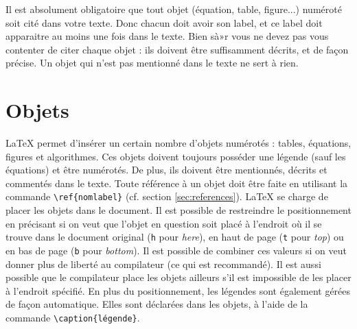 \documentclass{ceri}
\begin{document}
Il est absolument obligatoire que tout objet (équation, table, figure...) numéroté soit cité dans votre texte. Donc chacun doit avoir son label, et ce label doit apparaitre au moins une fois dans le texte. Bien sà»r vous ne devez pas vous contenter de citer chaque objet : ils doivent être suffisamment décrits, et de façon précise. Un objet qui n'est pas mentionné dans le texte ne sert à rien.



\section{Objets}
\label{sec:objets}
\LaTeX{} permet d'insérer un certain nombre d'objets numérotés : tables, équations, figures et algorithmes. Ces objets doivent toujours posséder une légende (sauf les équations) et être numérotés. De plus, ils doivent être mentionnés, décrits et commentés dans le texte. Toute référence à un objet doit être faite en utilisant la commande \texttt{\textbackslash{}ref\{nomlabel\}} (cf\@. section \ref{sec:references}).
\LaTeX{} se charge de placer les objets dans le document. Il est possible de restreindre le positionnement en précisant si on veut que l'objet en question soit placé à l'endroit où il se trouve dans le document original (\texttt{h} pour \textit{here}), en haut de page (\texttt{t} pour \textit{top}) ou en bas de page (\texttt{b} pour \textit{bottom}). Il est possible de combiner ces valeurs si on veut donner plus de liberté au compilateur (ce qui est recommandé). Il est aussi possible que le compilateur place les objets ailleurs s'il est impossible de les placer à l'endroit spécifié.
En plus du positionnement, les légendes sont également gérées de façon automatique. Elles sont déclarées dans les objets, à l'aide de la commande \texttt{\textbackslash{}caption\{légende\}}.
\end{document}
